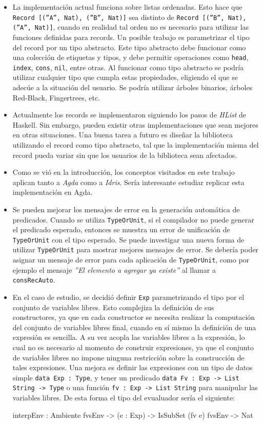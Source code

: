 \begin{itemize}
\item La implementación actual funciona sobre listas ordenadas. Esto hace que \texttt{Record [(''A'', Nat), (''B'', Nat)]} sea distinto de \texttt{Record [(''B'', Nat), (''A'', Nat)]}, cuando en realidad tal orden no es necesario para utilizar las funciones definidas para records. Un posible trabajo es parametrizar el tipo del record por un tipo abstracto. Este tipo abstracto debe funcionar como una colección de etiquetas y tipos, y debe permitir operaciones como \texttt{head}, \texttt{index}, \texttt{cons}, \texttt{nil}, entre otras. Al funcionar como tipo abstracto se podría utilizar cualquier tipo que cumpla estas propiedades, eligiendo el que se adecúe a la situación del usuario. Se podría utilizar árboles binarios, árboles Red-Black, Fingertrees, etc.

\item Actualmente los records se implementaron siguiendo los pasos de \textit{HList} de Haskell. Sin embargo, pueden existir otras implementaciones que sean mejores en otras situaciones. Una buena tarea a futuro es diseñar la biblioteca utilizando el record como tipo abstracto, tal que la implementación misma del record pueda variar sin que los usuarios de la biblioteca sean afectados.

\item Como se vió en la introducción, los conceptos visitados en este trabajo aplican tanto a \textit{Agda} como a \textit{Idris}. Sería interesante estudiar replicar esta implementación en Agda.

\item Se pueden mejorar los mensajes de error en la generación automática de predicados. Cuando se utiliza \texttt{TypeOrUnit}, si el compilador no puede generar el predicado esperado, entonces se muestra un error de unificación de \texttt{TypeOrUnit} con el tipo esperado. Se puede investigar una nueva forma de utilizar \texttt{TypeOrUnit} para mostrar mejores mensajes de error. Se debería poder asignar un mensaje de error para cada aplicación de \texttt{TypeOrUnit}, como por ejemplo el mensaje \textit{''El elemento a agregar ya existe''} al llamar a \texttt{consRecAuto}.

\item En el caso de estudio, se decidió definir \texttt{Exp} parametrizando el tipo por el conjunto de variables libres. Esto complejiza la definición de sus constructores, ya que en cada constructor se necesita realizar la computación del conjunto de variables libres final, cuando en sí mismo la definición de una expresión es sencilla. A su vez acopla las variables libres a la expresión, lo cual no es necesario al momento de construir expresiones, ya que el conjunto de variables libres no impone ninguna restricción sobre la construcción de tales expresiones. Una mejora es definir las expresiones con un tipo de datos simple \texttt{data Exp : Type}, y tener un predicado \texttt{data Fv : Exp -> List String -> Type} o una función \texttt{fv : Exp -> List String} para manipular las variables libres. De esta forma el tipo del evualuador sería el siguiente:

\begin{code}
interpEnv : Ambiente fvsEnv -> (e : Exp) ->
  IsSubSet (fv e) fvsEnv -> Nat
\end{code}
\end{itemize}
